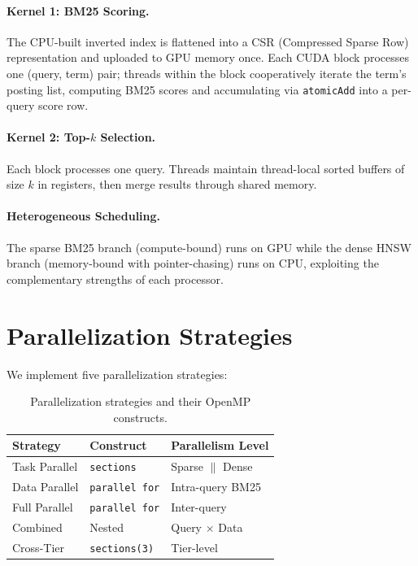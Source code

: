 \documentclass[sigconf,nonacm,anonymous]{acmart}
\begin{document}
\paragraph{Kernel 1: BM25 Scoring.}
The CPU-built inverted index is flattened into a CSR (Compressed
Sparse Row) representation and uploaded to GPU memory once.
Each CUDA block processes one (query, term) pair; threads within
the block cooperatively iterate the term's posting list, computing
BM25 scores and accumulating via \texttt{atomicAdd} into a
per-query score row.

\paragraph{Kernel 2: Top-$k$ Selection.}
Each block processes one query.  Threads maintain thread-local
sorted buffers of size $k$ in registers, then merge results
through shared memory.

\paragraph{Heterogeneous Scheduling.}
The sparse BM25 branch (compute-bound) runs on GPU while the
dense HNSW branch (memory-bound with pointer-chasing) runs on
CPU, exploiting the complementary strengths of each processor.

\section{Parallelization Strategies}
\label{sec:parallel}

We implement five parallelization strategies:

\begin{table}[t]
\caption{Parallelization strategies and their OpenMP constructs.}
\label{tab:strategies}
\centering
\small
\begin{tabular}{@{}lll@{}}
\toprule
Strategy & Construct & Parallelism Level \\
\midrule
Task Parallel & \texttt{sections} & Sparse $\parallel$ Dense \\
Data Parallel & \texttt{parallel for} & Intra-query BM25 \\
Full Parallel & \texttt{parallel for} & Inter-query \\
Combined & Nested & Query $\times$ Data \\
Cross-Tier & \texttt{sections(3)} & Tier-level \\
\bottomrule
\end{tabular}
\end{table}
\end{document}
